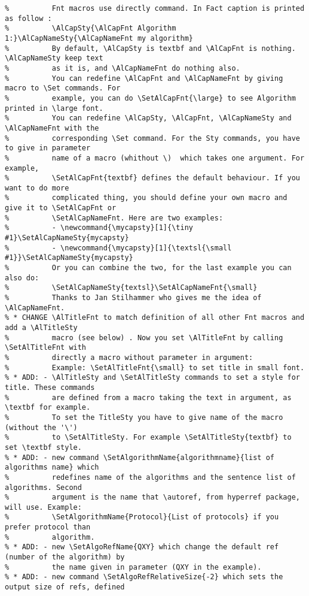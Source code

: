 \documentclass[a4paper]{article}
\begin{document}
\begin{verbatim}
%          Fnt macros use directly command. In Fact caption is printed as follow :
%          \AlCapSty{\AlCapFnt Algorithm 1:}\AlCapNameSty{\AlCapNameFnt my algorithm}
%          By default, \AlCapSty is textbf and \AlCapFnt is nothing. \AlCapNameSty keep text 
%          as it is, and \AlCapNameFnt do nothing also.
%          You can redefine \AlCapFnt and \AlCapNameFnt by giving macro to \Set commands. For
%          example, you can do \SetAlCapFnt{\large} to see Algorithm printed in \large font.
%          You can redefine \AlCapSty, \AlCapFnt, \AlCapNameSty and \AlCapNameFnt with the
%          corresponding \Set command. For the Sty commands, you have to give in parameter
%          name of a macro (whithout \)  which takes one argument. For example,
%          \SetAlCapFnt{textbf} defines the default behaviour. If you want to do more
%          complicated thing, you should define your own macro and give it to \SetAlCapFnt or
%          \SetAlCapNameFnt. Here are two examples:
%          - \newcommand{\mycapsty}[1]{\tiny #1}\SetAlCapNameSty{mycapsty}
%          - \newcommand{\mycapsty}[1]{\textsl{\small #1}}\SetAlCapNameSty{mycapsty}
%          Or you can combine the two, for the last example you can also do:
%          \SetAlCapNameSty{textsl}\SetAlCapNameFnt{\small}
%          Thanks to Jan Stilhammer who gives me the idea of \AlCapNameFnt.
% * CHANGE \AlTitleFnt to match definition of all other Fnt macros and add a \AlTitleSty 
%          macro (see below) . Now you set \AlTitleFnt by calling \SetAlTitleFnt with 
%          directly a macro without parameter in argument:
%          Example: \SetAlTitleFnt{\small} to set title in small font.
% * ADD: - \AlTitleSty and \SetAlTitleSty commands to set a style for title. These commands
%          are defined from a macro taking the text in argument, as \textbf for example. 
%          To set the TitleSty you have to give name of the macro (without the '\') 
%          to \SetAlTitleSty. For example \SetAlTitleSty{textbf} to set \textbf style.
% * ADD: - new command \SetAlgorithmName{algorithmname}{list of algorithms name} which
%          redefines name of the algorithms and the sentence list of algorithms. Second
%          argument is the name that \autoref, from hyperref package, will use. Example:
%          \SetAlgorithmName{Protocol}{List of protocols} if you prefer protocol than
%          algorithm.
% * ADD: - new \SetAlgoRefName{QXY} which change the default ref (number of the algorithm) by
%          the name given in parameter (QXY in the example). 
% * ADD: - new command \SetAlgoRefRelativeSize{-2} which sets the output size of refs, defined

\end{verbatim}
\end{document}
